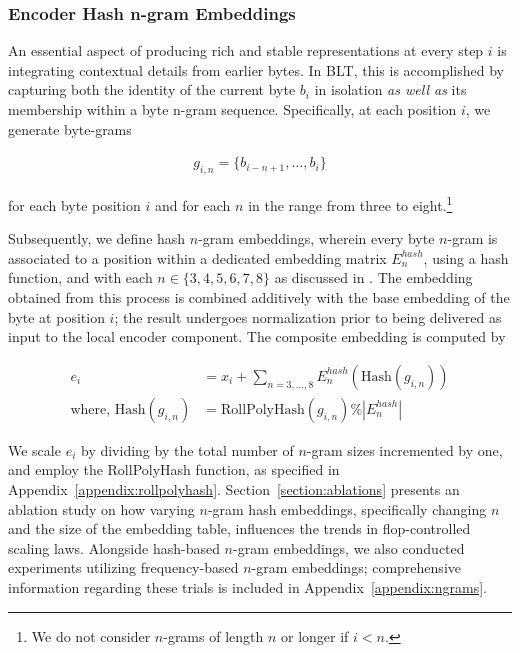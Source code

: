 \subsubsection{Encoder Hash n-gram Embeddings}
\label{sec:ngram-emb}
\label{sec:hash-emb}
An essential aspect of producing rich and stable representations at every step $i$ is integrating contextual details from earlier bytes. In {\textsc BLT}, this is accomplished by capturing both the identity of the current byte $b_i$ in isolation \textit{as well as} its membership within a byte n-gram sequence. Specifically, at each position $i$, we generate byte-grams

\begin{align}
    g_{i,n}=\{b_{i-n + 1},\ldots, b_i\}
\end{align}

for each byte position $i$ and for each $n$ in the range from three to eight.\footnote{
We do not consider $n$-grams of length $n$ or longer if $i<n$. }

Subsequently, we define hash $n$-gram embeddings, wherein every byte $n$-gram is associated to a position within a dedicated embedding matrix $E_{n}^{hash}$, using a hash function, and with each $n \in\{3,4,5,6,7,8\}$ as discussed in \citet{bai2010learning}. The embedding obtained from this process is combined additively with the base embedding of the byte at position $i$; the result undergoes normalization prior to being delivered as input to the local encoder component. The composite embedding is computed by

\begin{align}
e_i &= x_i + \sum_{n = 3,...,8}E_{n}^{hash}(\text{Hash}(g_{i,n})) \\
\text{where, Hash}(g_{i,n}) &= \text{RollPolyHash}(g_{i,n}) \% |E_{n}^{hash}|
\end{align}

We scale $e_i$ by dividing by the total number of $n$-gram sizes incremented by one, and employ the RollPolyHash function, as specified in Appendix~\ref{appendix:rollpolyhash}. Section~\ref{section:ablations} presents an ablation study on how varying $n$-gram hash embeddings, specifically changing $n$ and the size of the embedding table, influences the trends in flop-controlled scaling laws. Alongside hash-based $n$-gram embeddings, we also conducted experiments utilizing frequency-based $n$-gram embeddings; comprehensive information regarding these trials is included in Appendix~\ref{appendix:ngrams}.

